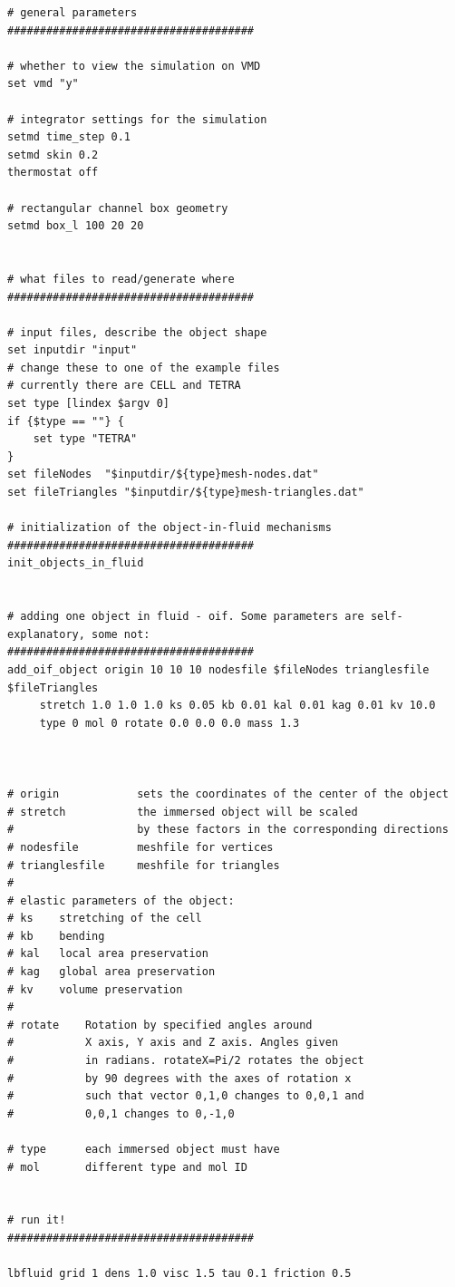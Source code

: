 \documentclass[a4paper]{article}
\begin{document}
\begin{verbatim}
# general parameters
######################################

# whether to view the simulation on VMD
set vmd "y"

# integrator settings for the simulation
setmd time_step 0.1    
setmd skin 0.2
thermostat off

# rectangular channel box geometry
setmd box_l 100 20 20


# what files to read/generate where
######################################

# input files, describe the object shape
set inputdir "input"
# change these to one of the example files
# currently there are CELL and TETRA
set type [lindex $argv 0]
if {$type == ""} {
    set type "TETRA"
}
set fileNodes  "$inputdir/${type}mesh-nodes.dat"
set fileTriangles "$inputdir/${type}mesh-triangles.dat"

# initialization of the object-in-fluid mechanisms
######################################
init_objects_in_fluid	


# adding one object in fluid - oif. Some parameters are self-explanatory, some not:
######################################
add_oif_object origin 10 10 10 nodesfile $fileNodes trianglesfile $fileTriangles 
     stretch 1.0 1.0 1.0 ks 0.05 kb 0.01 kal 0.01 kag 0.01 kv 10.0 
     type 0 mol 0 rotate 0.0 0.0 0.0 mass 1.3
     


# origin            sets the coordinates of the center of the object
# stretch           the immersed object will be scaled 
#                   by these factors in the corresponding directions
# nodesfile         meshfile for vertices
# trianglesfile     meshfile for triangles
#
# elastic parameters of the object:
# ks    stretching of the cell
# kb    bending
# kal   local area preservation
# kag   global area preservation
# kv    volume preservation
#
# rotate    Rotation by specified angles around 
#           X axis, Y axis and Z axis. Angles given
#           in radians. rotateX=Pi/2 rotates the object 
#           by 90 degrees with the axes of rotation x 
#           such that vector 0,1,0 changes to 0,0,1 and
#           0,0,1 changes to 0,-1,0

# type      each immersed object must have 	
# mol       different type and mol ID


# run it!
######################################

lbfluid grid 1 dens 1.0 visc 1.5 tau 0.1 friction 0.5


\end{verbatim}
\end{document}
